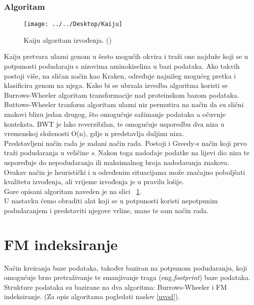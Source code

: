 \documentclass[times, utf8, seminar]{fer}
\begin{document}
\subsection{Algoritam}

\begin{figure}
	\centering
	\texttt{[image: ../../Desktop/Kaiju]}
	\caption{Kaiju algoritam izvođenja. (\cite{Kaiju})}
	\label{fig:kaiju}
\end{figure}
Kaiju pretvara ulazni genom u šesto mogućih okvira i traži one najduže koji se u potpunosti podudaraju s nizovima aminokiselina u bazi podataka.  Ako takvih postoji više, na sličan način kao Kraken, određuje najnižeg mogućeg pretka i klasificira genom na njega. Kako bi se ubrzala izvedba algoritma koristi se Burrows-Wheeler algoritam transformacije nad proteinskom bazom podataka.
\\Buttows-Wheeler tranform algoritam ulazni niz permutira na način da su slični znakovi blizu jedan drugog, što omogućuje sažimanje podataka a očuvnje konteksta. BWT je lako reverzibilan, te omogućuje usporedbu dva niza u vremenskoj složenosti O(n), gdje n predstavlja duljinu niza.
\\Predstavljeni način rada je zadani način rada. Postoji i Greedy-s način koji prvo traži podudaranja u veličine \textit{s}. Nakon toga nadodaje podatke na lijevi dio niza te uspoređuje do nepodudaranja ili maksimalnog broja nadodavanja znakova. Ovakav način je heuristički i u određenim situacijama može značajno poboljšati kvalitetu izvođenja, ali vrijeme izvođenja je u pravilu lošije.
\\Gore opisani algoritam naveden je na slici ~\ref{fig:kaiju}.
\\U nastavku ćemo obraditi alat koji se u potpunosti koristi nepotpunim podudaranjem i predstaviti njegove vrline, mane te sam način rada.
\chapter{FM indeksiranje}
Način kreiranja baze podataka, također baziran na potpunom podudaranju, koji omogućuje brzo pretraživanje te smanjivanje traga (eng.\textit{footprint}) baze podataka. Strukture podataka su bazirane na dva algoritma: Burrows-Wheeler i FM indeksiranje. (Za opis algoritama pogledati naslov \ref{uvod}).
\end{document}
